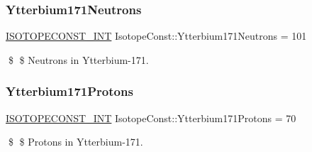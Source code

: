 \subsubsection{\texorpdfstring{Ytterbium171\+Neutrons}{Ytterbium171Neutrons}}
{\footnotesize\ttfamily \mbox{\hyperlink{group___isotope_const-_macros_ga5f18360b3e99483a35c32d789e62621c}{I\+S\+O\+T\+O\+P\+E\+C\+O\+N\+S\+T\+\_\+\+I\+NT}} Isotope\+Const\+::\+Ytterbium171\+Neutrons = 101}

\$ \$ Neutrons in Ytterbium-\/171. \mbox{\label{group___isotope_const-_ytterbium-_yb171_gad6e8d72b4282b688ed2a3090318e24e5}} 
\subsubsection{\texorpdfstring{Ytterbium171\+Protons}{Ytterbium171Protons}}
{\footnotesize\ttfamily \mbox{\hyperlink{group___isotope_const-_macros_ga5f18360b3e99483a35c32d789e62621c}{I\+S\+O\+T\+O\+P\+E\+C\+O\+N\+S\+T\+\_\+\+I\+NT}} Isotope\+Const\+::\+Ytterbium171\+Protons = 70}

\$ \$ Protons in Ytterbium-\/171. 